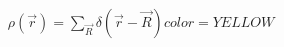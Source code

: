 \documentclass[preview]{standalone}
\begin{document}
\begin{align*}
\rho(\vec{r}) = \sum_{\vec{R}} \delta(\vec{r} - \vec{R}) color=YELLOW
\end{align*}
\end{document}
